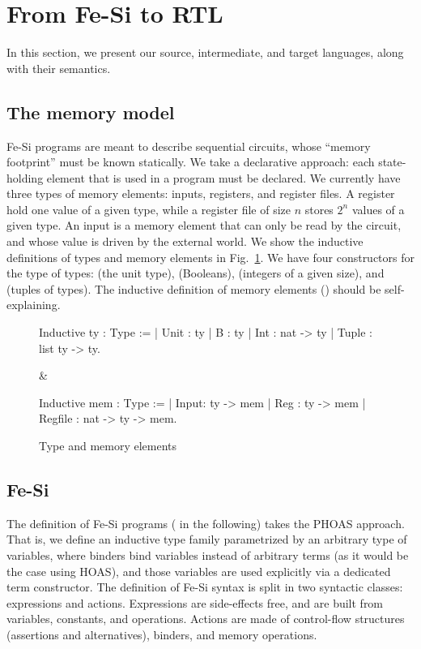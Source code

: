 \documentclass[preprint]{sigplanconf}
\begin{document}
\section{From Fe-Si to RTL}
In this section, we present our source, intermediate, and target
languages, along with their semantics.
%

\subsection{The memory model}
Fe-Si programs are meant to describe sequential circuits, whose
``memory footprint'' must be known statically. We take a declarative
approach: each state-holding element that is used in a program must be
declared. 
%
We currently have three types of memory elements: inputs, registers,
and register files. A register hold one value of a given type, while a
register file of size $n$ stores $2^n$ values of a given type. 
%
An input is a memory element that can only be read by the circuit,
and whose value is driven by the external world.
%
We show the inductive definitions of types and memory elements in
Fig.~\ref{fig:type}. 
%
We have four constructors for the type  of types: 
(the unit type),  (Booleans),  (integers of a given
size), and  (tuples of types). The inductive definition of
memory elements () should be self-explaining. 

\begin{figure}
  \centering
\begin{twolistings}
\begin{coq}
Inductive ty : Type :=
| Unit : ty 
| B : ty 
| Int : nat -> ty
| Tuple : list ty -> ty.     
\end{coq}&
\begin{coq}
Inductive mem : Type :=
| Input: ty ->  mem
| Reg : ty -> mem
| Regfile : nat -> ty -> mem. 
$ $
\end{coq}
\end{twolistings}
\caption{Type and memory elements}
  \label{fig:type}
\end{figure}



\subsection{Fe-Si}
The definition of Fe-Si programs ( in the following)
takes the PHOAS approach. 
%
That is, we define an inductive type family parametrized by an
arbitrary type  of variables, where binders bind variables
instead of arbitrary terms (as it would be the case using HOAS), and
those variables are used explicitly via a dedicated term constructor.
%
The definition of Fe-Si syntax is split in two syntactic classes:
expressions and actions. 
%
Expressions are side-effects free, and are built from variables,
constants, and operations.
%
Actions are made of control-flow structures (assertions and
alternatives), binders, and memory operations. 
\end{document}
